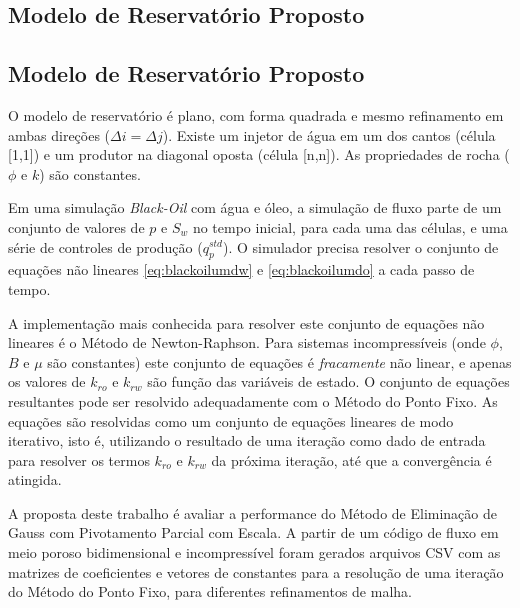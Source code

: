 \documentclass[final,5p]{elsarticle}
\numberwithin{equation}{section}
\begin{document}
    \subsection{Modelo de Reservatório Proposto}


    \subsection{Modelo de Reservatório Proposto}
        O modelo de reservatório é plano, com forma quadrada e mesmo refinamento em ambas direções ($\Delta i = \Delta j$). Existe um injetor de água em um dos cantos (célula [1,1]) e um produtor na diagonal oposta (célula [n,n]). As propriedades de rocha ($\phi$ e $k$) são constantes.

        Em uma simulação \emph{Black-Oil} com água e óleo, a simulação de fluxo parte de um conjunto de valores de $p$ e $S_w$ no tempo inicial, para cada uma das células, e uma série de controles de produção ($q^{std}_p$). O simulador precisa resolver o conjunto de equações não lineares \ref{eq:blackoilumdw} e \ref{eq:blackoilumdo} a cada passo de tempo.

        A implementação mais conhecida para resolver este conjunto de equações não lineares é o Método de Newton-Raphson. Para sistemas incompressíveis (onde $\phi$, $B$ e $\mu$ são constantes) este conjunto de equações é \emph{fracamente} não linear, e apenas os valores de $k_{ro}$ e $k_{rw}$ são função das variáveis de estado. O conjunto de equações resultantes pode ser resolvido adequadamente com o Método do Ponto Fixo. As equações são resolvidas como um conjunto de equações lineares de modo iterativo, isto é, utilizando o resultado de uma iteração como dado de entrada para resolver os termos $k_{ro}$ e $k_{rw}$ da próxima iteração, até que a convergência é atingida.

        A proposta deste trabalho é avaliar a performance do Método de Eliminação de Gauss com Pivotamento Parcial com Escala. A partir de um código de fluxo em meio poroso bidimensional e incompressível foram gerados arquivos CSV com as matrizes de coeficientes e vetores de constantes para a resolução de uma iteração do Método do Ponto Fixo, para diferentes refinamentos de malha.

\end{document}
